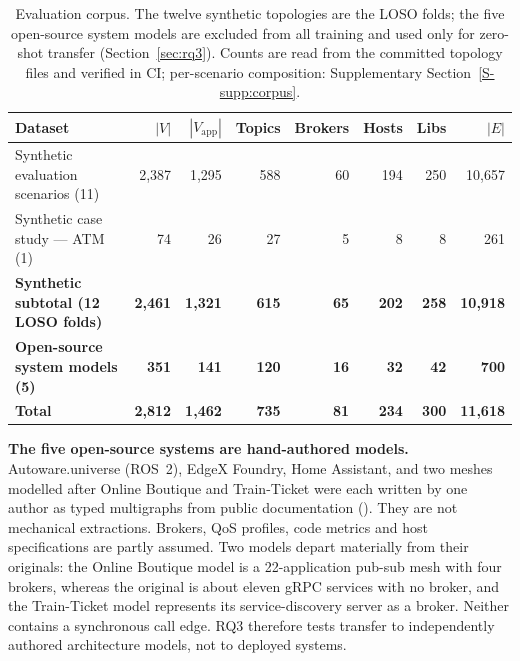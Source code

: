 \documentclass[preprint,3p]{elsarticle}
\begin{document}
\begin{table}[htbp]
\centering
\small
\caption{Evaluation corpus. The twelve synthetic topologies are the LOSO folds; the five open-source system models are excluded from all training and used only for zero-shot transfer (Section~\ref{sec:rq3}). Counts are read from the committed topology files and verified in CI; per-scenario composition: Supplementary Section~\ref{S-supp:corpus}.}
\label{tab:4}
\begin{tabular}{lrrrrrrr}
\toprule
\textbf{Dataset} & \textbf{$|V|$} & \textbf{$|V_{\text{app}}|$} & \textbf{Topics} & \textbf{Brokers} & \textbf{Hosts} & \textbf{Libs} & \textbf{$|E|$} \\
\midrule
Synthetic evaluation scenarios (11) & 2{,}387 & 1{,}295 & 588 & 60 & 194 & 250 & 10{,}657 \\
Synthetic case study — ATM (1)    &    74 &    26 &  27 &  5 &   8 &   8 &   261 \\
\midrule
\textbf{Synthetic subtotal (12 LOSO folds)} & \textbf{2{,}461} & \textbf{1{,}321} & \textbf{615} & \textbf{65} & \textbf{202} & \textbf{258} & \textbf{10{,}918} \\
\textbf{Open-source system models (5)}    & \textbf{351}    &   \textbf{141} & \textbf{120} & \textbf{16} &  \textbf{32} &  \textbf{42} & \textbf{700} \\
\midrule
\textbf{Total} & \textbf{2{,}812} & \textbf{1{,}462} & \textbf{735} & \textbf{81} & \textbf{234} & \textbf{300} & \textbf{11{,}618} \\
\bottomrule
\end{tabular}
\end{table}

\noindent\textbf{The five open-source systems are hand-authored models.} Autoware.universe (ROS~2), EdgeX Foundry, Home Assistant, and two meshes modelled after Online Boutique and Train-Ticket were each written by one author as typed multigraphs from public documentation (). They are not mechanical extractions. Brokers, QoS profiles, code metrics and host specifications are partly assumed. Two models depart materially from their originals: the Online Boutique model is a 22-application pub-sub mesh with four brokers, whereas the original is about eleven gRPC services with no broker, and the Train-Ticket model represents its service-discovery server as a broker. Neither contains a synchronous call edge. RQ3 therefore tests transfer to independently authored architecture models, not to deployed systems.
\end{document}
